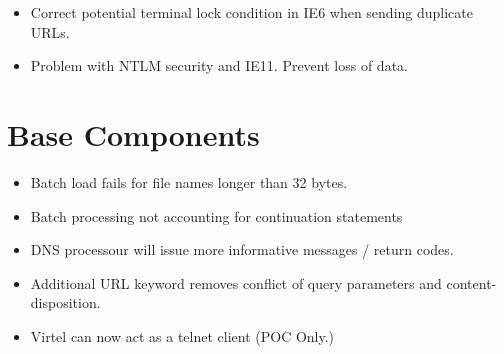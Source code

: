 \documentclass[letterpaper,10pt,english]{sphinxmanual}
\begin{document}
\begin{itemize}
\item {} 
Correct potential terminal lock condition in IE6 when sending duplicate URLs.

\end{itemize}

\begin{itemize}
\item {} 
Problem with NTLM security and IE11. Prevent loss of data.

\end{itemize}

\newpage


\section{Base Components}
\label{\detokenize{TN201902:base-components}}
\begin{itemize}
\item {} 
Batch load fails for file names longer than 32 bytes.

\end{itemize}

\begin{itemize}
\item {} 
Batch processing not accounting for continuation statements

\end{itemize}

\begin{itemize}
\item {} 
DNS processour will issue more informative messages / return codes.

\end{itemize}

\begin{itemize}
\item {} 
Additional URL keyword removes conflict of query parameters and content-disposition.

\end{itemize}

\begin{itemize}
\item {} 
Virtel can now act as a telnet client (POC Only.)

\end{itemize}
\end{document}
